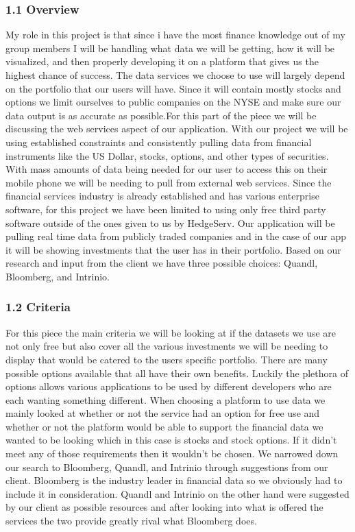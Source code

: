 \documentclass[onecolumn, draftclsnofoot,10pt, compsoc]{IEEEtran}
\begin{document}
\subsubsection{1.1 Overview}
My role in this project is that since i have the most finance knowledge out of my group members I will be handling what data we will be getting, how it will be visualized, and then properly developing it on a platform that gives us the highest chance of success. The data services we choose to use will largely depend on the portfolio that our users will have. Since it will contain mostly stocks and options we limit ourselves to public companies on the NYSE and make sure our data output is as accurate as possible.For this part of the piece we will be discussing the web services aspect of our application. With our project we will be using established constraints and consistently pulling data from financial instruments like the US Dollar, stocks, options, and other types of securities. With mass amounts of data being needed for our user to access this on their mobile phone we will be needing to pull from external web services. Since the financial services industry is already established and has various enterprise software, for this project we have been limited to using only free third party software outside of the ones given to us by HedgeServ. Our application will be pulling real time data from publicly traded companies and in the case of our app it will be showing investments that the user has in their portfolio. Based on our research and input from the client we have three possible choices: Quandl, Bloomberg, and Intrinio.


\subsubsection{1.2 Criteria}
For this piece the main criteria we will be looking at if the datasets we use are not only free but also cover all the various investments we will be needing to display that would be catered to the users specific portfolio. There are many possible options available that all have their own benefits. Luckily the plethora of options allows various applications to be used by different developers who are each wanting something different. When choosing a platform to use data we mainly looked at whether or not the service had an option for free use and whether or not the platform would be able to support the financial data we wanted to be looking which in this case is stocks and stock options. If it didn’t meet any of those requirements then it wouldn’t be chosen. We narrowed down our search to Bloomberg, Quandl, and Intrinio through suggestions from our client. Bloomberg is the industry leader in financial data so we obviously had to include it in consideration. Quandl and Intrinio on the other hand were suggested by our client as possible resources and after looking into what is offered the services the two provide greatly rival what Bloomberg does. 
\end{document}
